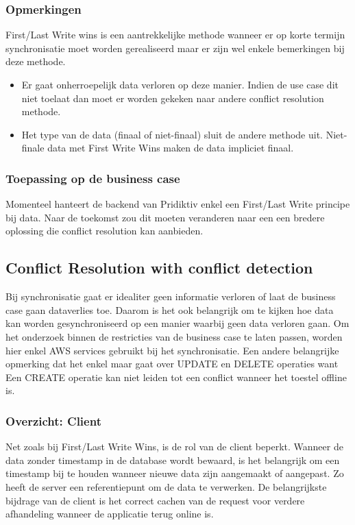 \subsubsection{Opmerkingen}
First/Last Write wins is een aantrekkelijke methode wanneer er op korte termijn synchronisatie moet worden gerealiseerd maar er zijn wel enkele bemerkingen bij deze methode.
\begin{itemize}
\item Er gaat onherroepelijk data verloren op deze manier. Indien de use case dit niet toelaat dan moet er worden gekeken naar andere conflict resolution methode.
\item Het type van de data (finaal of niet-finaal) sluit de andere methode uit. Niet-finale data met First Write Wins maken de data impliciet finaal.
\end{itemize}
\subsubsection{Toepassing op de business case}
Momenteel hanteert de backend van Pridiktiv enkel een First/Last Write principe bij data. Naar de toekomst zou dit moeten veranderen naar een een bredere oplossing die conflict resolution kan aanbieden.

\subsection{Conflict Resolution with conflict detection}
Bij synchronisatie gaat er idealiter geen informatie verloren of laat de business case gaan dataverlies toe. Daarom is het ook belangrijk om te kijken hoe data kan worden gesynchroniseerd op een manier waarbij geen data verloren gaan. Om het onderzoek binnen de restricties van de business case te laten passen, worden hier enkel AWS services gebruikt bij het synchronisatie. Een andere belangrijke opmerking dat het enkel maar gaat over UPDATE en DELETE operaties want Een CREATE operatie kan niet leiden tot een conflict wanneer het toestel offline is.
\subsubsection{Overzicht: Client}
Net zoals bij First/Last Write Wins, is de rol van de client beperkt. Wanneer de data zonder timestamp in de database wordt bewaard, is het belangrijk om een timestamp bij te houden wanneer nieuwe data zijn aangemaakt of aangepast. Zo heeft de server een referentiepunt om de data te verwerken. De belangrijkste bijdrage van de client is het correct cachen van de request voor verdere afhandeling wanneer de applicatie terug online is.
